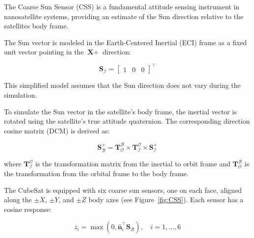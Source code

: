 \label{sec:CSSModel}

The Coarse Sun Sensor (CSS) is a fundamental attitude sensing instrument in nanosatellite systems, providing an estimate of the Sun direction relative 
to the satellites body frame.
\vspace{0.5cm}

\noindent The Sun vector is modeled in the Earth-Centered Inertial (ECI) frame as a fixed unit vector pointing in the $\textbf{X}+$ direction:

\begin{equation}
    \mathbf{S}_\mathcal{I} = \begin{bmatrix} 1 & 0 & 0 \end{bmatrix}^\top
\end{equation}

\noindent This simplified model assumes that the Sun direction does not vary during the simulation.
\vspace{0.5cm}

\noindent To simulate the Sun vector in the satellite's body frame, the inertial vector is rotated using the satellite's true attitude quaternion. 
The corresponding direction cosine matrix (DCM) is derived as:

\begin{equation}
     \mathbf{S}_\mathcal{B}^+ = \mathbf{T}_\mathcal{O}^\mathcal{B} \times \mathbf{T}_\mathcal{I}^\mathcal{O} \times \mathbf{S}_\mathcal{I}^+
\end{equation}

\noindent where $\mathbf{T}_\mathcal{I}^\mathcal{O}$ is the transformation matrix from the inertial to orbit frame and $\mathbf{T}_\mathcal{O}^\mathcal{B}$ is the
transformation from the orbital frame to the body frame.
\vspace{0.5cm}

\noindent The CubeSat is equipped with six coarse sun sensors, one on each face, aligned along the $\pm X$, $\pm Y$, and $\pm Z$ body 
axes (see Figure~\ref{fig:CSS}). Each sensor has a cosine response:

\begin{equation}
     z_i = \max\left(0, \hat{\mathbf{n}}_i^\top \mathbf{S}_\mathcal{B} \right), \quad i = 1, \dots, 6
\end{equation}

